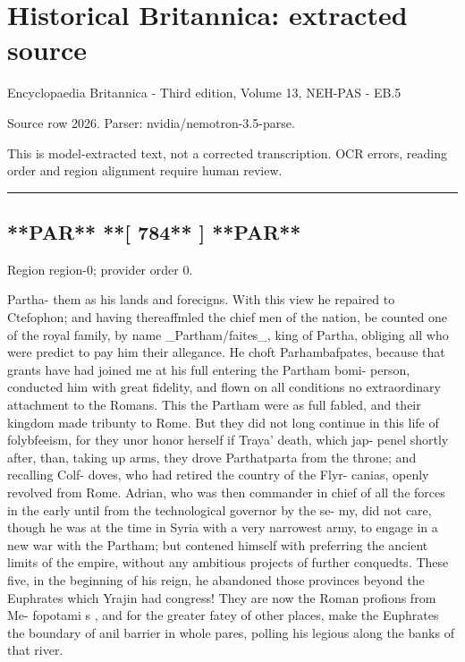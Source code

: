 \documentclass[11pt]{article}
\begin{document}
\section*{Historical Britannica: extracted source}
Encyclopaedia Britannica - Third edition, Volume 13, NEH-PAS - EB.5\par
{\small Source row 2026. Parser: nvidia/nemotron-3.5-parse.\par}
{\small This is model-extracted text, not a corrected transcription. OCR errors, reading order and region alignment require human review.\par}
\hrule\medskip
\subsection*{**PAR** **[ 784** ] **PAR**}

{\scriptsize\color{gray} Region region-0; provider order 0.\par}
\medskip

Partha- them as his lands and forecigns. With this view he repaired to Ctefophon; and having thereaffmled the chief men of the nation, be counted one of the royal family, by name \_Partham/faites\_, king of Partha, obliging all who were predict to pay him their allegance. He choft Parhambafpates, because that grants have had joined me at his full entering the Partham bomi- person, conducted him with great fidelity, and flown on all conditions no extraordinary attachment to the Romans. This the Partham were as full fabled, and their kingdom made tribunty to Rome. But they did not long continue in this life of folybfeeism, for they unor honor herself if Traya’ death, which jap- penel shortly after, than, taking up arms, they drove Parthatparta from the throne; and recalling Colf- doves, who had retired the country of the Flyr- canias, openly revolved from Rome. Adrian, who was then commander in chief of all the forces in the early until from the technological governor by the se- my, did not care, though he was at the time in Syria with a very narrowest army, to engage in a new war with the Partham; but contened himself with preferring the ancient limits of the empire, without any ambitious projects of further conquedts. These five, in the beginning of his reign, he abandoned those provinces beyond the Euphrates which Yrajin had congress! They are now the Roman profions from Me- fopotami s , and for the greater fatey of other places, make the Euphrates the boundary of anil barrier in whole pares, polling his legious along the banks of that river.
\par
\end{document}
